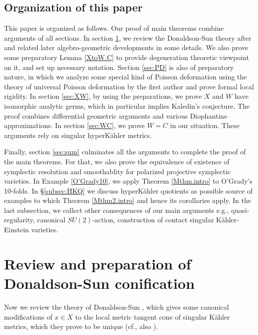 \documentclass[12pt,a4paper]{amsart}
\theoremstyle{remark}
\theoremstyle{definition}
\begin{document}
\subsection{Organization of this paper}
This paper is organized as follows. Our proof of main theorems 
combine arguments of all sections. 
In section \ref{sec:2}, we review the 
Donaldson-Sun theory after \cite{DSII} 
and related later algebro-geometric 
developments in some details. We also prove 
some preparatory Lemma \ref{XtoW.C} to provide 
degeneration 
theoretic viewpoint on it, and 
set up necessary notation. 
Section \ref{sec:PD} is also of preparatory nature, in which 
we analyze some special kind of 
Poisson deformation using the theory of universal Poisson deformation 
by the first author and prove formal local rigidity. 
In section \ref{sec:XW}, by using the preparations, we prove 
$X$ and $W$ have isomorphic analytic germs, which in particular 
implies Kaledin's conjecture. 
The proof combines differential geometric arguments and 
various Diophantine approximations. 
In section \ref{sec:WC}, we prove $W=C$ in our situation. 
These arguments rely 
on singular hyperK\"ahler metrics. 

Finally, section \ref{sec:sum} culminates all the arguments 
to complete the proof of the main theorems. 
For that, we also prove the equivalence of 
existence of symplectic resolution and smoothablity for 
polarized projective symplectic varieties. In Example 
\ref{O'Grady10}, we apply Theorem \ref{Mthm.intro} to O'Grady's 10-folds. 
In \S \ref{subsec:HKQ} 
we discuss hyperK\"ahler quotients as possible source of 
examples 
to which Theorem \ref{Mthm2.intro} and hence its 
corollaries apply. In the last subsection, 
we collect other consequences of our main arguments e.g., 
quasi-regularity, canonical $SU(2)$-action, construction of contact 
singular K\"ahler-Einstein varieties. 


\section{Review and preparation of 
Donaldson-Sun conification}\label{sec:2}

Now we review the theory of Donaldson-Sun \cite{DSII}, which gives some canonical 
modifications of $x\in X$ to the local metric tangent cone of 
singular K\"ahler metrics, which they prove to be unique (cf., also \cite{ColdingMinicozzi}). 
\end{document}
